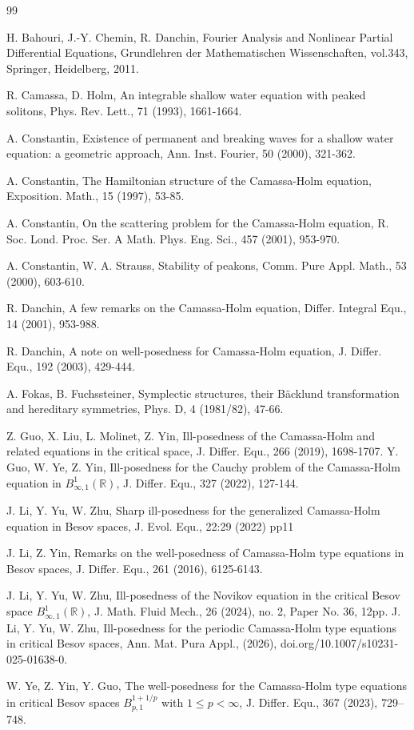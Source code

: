 \documentclass[12pt]{article}
\newcommand{\R}{\mathbb{R}}
\begin{document}
\begin{thebibliography}{99}
\linespread{0}\addtolength{\itemsep}{-1.0ex}


 H. Bahouri, J.-Y. Chemin, R. Danchin, Fourier Analysis and Nonlinear Partial Differential Equations, Grundlehren der Mathematischen Wissenschaften, vol.343, Springer, Heidelberg, 2011.

 R. Camassa, D. Holm, An integrable shallow water equation with peaked solitons, Phys. Rev. Lett., 71 (1993), 1661-1664.

 A. Constantin, Existence of permanent and breaking waves for a shallow water equation: a geometric approach, Ann. Inst. Fourier, 50 (2000), 321-362.

 A. Constantin, The Hamiltonian structure of the Camassa-Holm equation, Exposition. Math., 15 (1997), 53-85.

 A. Constantin, On the scattering problem for the Camassa-Holm equation, R. Soc. Lond. Proc. Ser. A Math. Phys. Eng. Sci.,  457 (2001), 953-970.

  A. Constantin, W. A. Strauss, Stability of peakons, Comm. Pure Appl. Math., 53 (2000), 603-610.

 R. Danchin, A few remarks on the Camassa-Holm equation, Differ. Integral Equ., 14 (2001), 953-988.


 R. Danchin, A note on well-posedness for Camassa-Holm equation, J. Differ. Equ., 192 (2003), 429-444.


 A. Fokas, B. Fuchssteiner, Symplectic structures, their B\"{a}cklund transformation and hereditary symmetries, Phys. D, 4 (1981/82), 47-66.

 Z. Guo, X. Liu, L. Molinet, Z. Yin, Ill-posedness of the Camassa-Holm and related equations in the critical space, J. Differ. Equ., 266 (2019), 1698-1707.
Y. Guo, W. Ye, Z. Yin, Ill-posedness for the Cauchy problem of the Camassa-Holm equation in $B^{1}_{\infty,1}(\R)$, J. Differ. Equ.,  327 (2022), 127-144.



 J. Li, Y. Yu, W. Zhu, Sharp ill-posedness for the generalized Camassa-Holm equation in Besov spaces, J. Evol. Equ., 22:29 (2022) pp11

 J. Li, Z. Yin, Remarks on the well-posedness of Camassa-Holm type equations in Besov spaces, J. Differ. Equ., 261 (2016), 6125-6143.

J. Li, Y. Yu, W. Zhu, Ill-posedness of the Novikov equation in the critical Besov space $B_{\infty,1}^1(\R)$, J. Math. Fluid Mech., 26 (2024), no. 2, Paper No. 36, 12pp.
 J. Li, Y. Yu, W. Zhu, Ill-posedness for the periodic Camassa-Holm type equations in critical Besov spaces, Ann. Mat. Pura Appl., (2026), doi.org/10.1007/s10231-025-01638-0.

 W. Ye, Z. Yin, Y. Guo, The well-posedness for the Camassa-Holm type equations in critical Besov spaces $B^{1+1/p}_{p,1}$ with  $1\leq p<\infty$, J. Differ. Equ., 367 (2023), 729--748.


\end{thebibliography}
\end{document}

